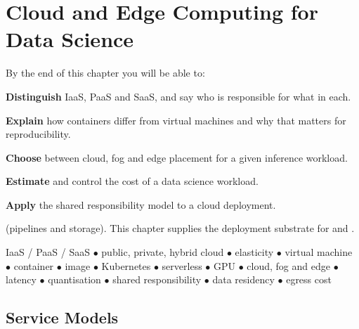 \chapter{Cloud and Edge Computing for Data Science}\label{ch:cloudedge}

\begin{outcomes}
By the end of this chapter you will be able to:
\begin{tight}
  \item \textbf{Distinguish} IaaS, PaaS and SaaS, and say who is responsible for what in each.
  \item \textbf{Explain} how containers differ from virtual machines and why that matters for reproducibility.
  \item \textbf{Choose} between cloud, fog and edge placement for a given inference workload.
  \item \textbf{Estimate} and control the cost of a data science workload.
  \item \textbf{Apply} the shared responsibility model to a cloud deployment.
\end{tight}
\end{outcomes}

\begin{prereq}
 (pipelines and storage). This chapter supplies the deployment
substrate for  and .
\end{prereq}

\begin{keyterms}
IaaS / PaaS / SaaS $\bullet$ public, private, hybrid cloud $\bullet$ elasticity
$\bullet$ virtual machine $\bullet$ container $\bullet$ image $\bullet$ Kubernetes
$\bullet$ serverless $\bullet$ GPU $\bullet$ cloud, fog and edge $\bullet$ latency
$\bullet$ quantisation $\bullet$ shared responsibility $\bullet$ data residency
$\bullet$ egress cost
\end{keyterms}

\section{Service Models}

